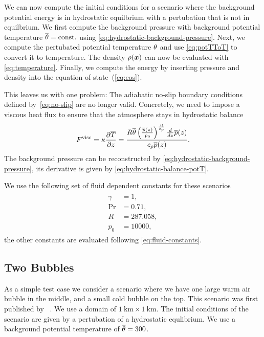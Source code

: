 We can now compute the initial conditions for a scenario where the background potential energy is in hydrostatic equilbrium with a pertubation that is not in equilbrium.
We first compute the background pressure with background potential temperature $\overline{\theta} = \text{const.}$ using \cref{eq:hydrostatic-background-pressure}.
Next, we compute the pertubated potential temperature $\theta$ and use \cref{eq:potTToT} to convert it to temperature.
The density $\rho(\bm{x})$ can now be evaluated with \cref{eq:temperature}.
Finally, we compute the energy by inserting pressure and density into the equation of state~(\ref{eq:eos}).

This leaves us with one problem:
The adiabatic no-slip boundary conditions defined by~\vref{eq:no-slip} are no longer valid.
Concretely, we need to impose a viscous heat flux to ensure that the atmosphere stays in hydrostatic balance~\cite{giraldo2008study}
\begin{equation}
  \label{eq:atmosphere-bc}
  F^\text{visc} = \kappa \pdv{\overline{T}}{z} =
\frac{R \overline{\theta} \left(\frac{\overline{p}{\left (z \right )}}{p_{0}}\right)^{\frac{R}{c_{p}}} \frac{d}{d z} \overline{p}{\left (z \right )}}{c_{p} \overline{p}{\left (z \right )}}.
\end{equation}
The background pressure can be reconstructed by \cref{eq:hydrostatic-background-pressure}, its derivative is given by \cref{eq:hydrostatic-balance-potT}.

We use the following set of fluid dependent constants for these scenarios
\begin{align}
  \begin{split}
    \gamma &= 1, \\
    \Pr &=  0.71, \\
    R &= 287.058, \\
    p_0 &= 10000,
  \end{split}
\end{align}
the other constants are evaluated following \cref{eq:fluid-constants}.

\subsection{Two Bubbles}
As a simple test case we consider a scenario where we have one large warm air bubble in the middle, and a small cold bubble on the top.
This scenario was first published by \citeauthor{robert1993bubble}~\cite{robert1993bubble}.
We use a domain of $\SI{1}{\km} \times \SI{1}{\km}$.
The initial conditions of the scenario are given by a pertubation of a hydrostatic equlibrium.
We use a background potential temperature of $\overline{\theta} = 300$.

